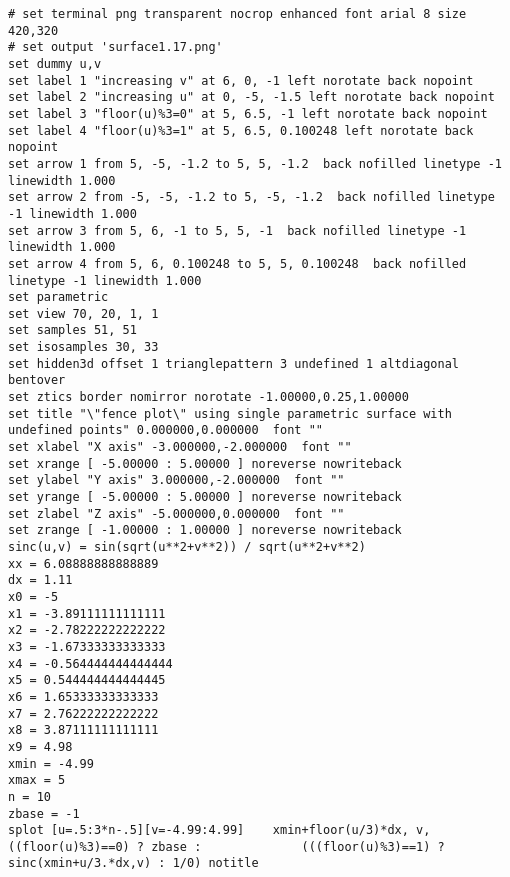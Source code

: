 \begin{itemize}
\begin{verbatim}
# set terminal png transparent nocrop enhanced font arial 8 size 420,320 
# set output 'surface1.17.png'
set dummy u,v
set label 1 "increasing v" at 6, 0, -1 left norotate back nopoint
set label 2 "increasing u" at 0, -5, -1.5 left norotate back nopoint
set label 3 "floor(u)%3=0" at 5, 6.5, -1 left norotate back nopoint
set label 4 "floor(u)%3=1" at 5, 6.5, 0.100248 left norotate back nopoint
set arrow 1 from 5, -5, -1.2 to 5, 5, -1.2  back nofilled linetype -1 linewidth 1.000
set arrow 2 from -5, -5, -1.2 to 5, -5, -1.2  back nofilled linetype -1 linewidth 1.000
set arrow 3 from 5, 6, -1 to 5, 5, -1  back nofilled linetype -1 linewidth 1.000
set arrow 4 from 5, 6, 0.100248 to 5, 5, 0.100248  back nofilled linetype -1 linewidth 1.000
set parametric
set view 70, 20, 1, 1
set samples 51, 51
set isosamples 30, 33
set hidden3d offset 1 trianglepattern 3 undefined 1 altdiagonal bentover
set ztics border nomirror norotate -1.00000,0.25,1.00000
set title "\"fence plot\" using single parametric surface with undefined points" 0.000000,0.000000  font ""
set xlabel "X axis" -3.000000,-2.000000  font ""
set xrange [ -5.00000 : 5.00000 ] noreverse nowriteback
set ylabel "Y axis" 3.000000,-2.000000  font ""
set yrange [ -5.00000 : 5.00000 ] noreverse nowriteback
set zlabel "Z axis" -5.000000,0.000000  font ""
set zrange [ -1.00000 : 1.00000 ] noreverse nowriteback
sinc(u,v) = sin(sqrt(u**2+v**2)) / sqrt(u**2+v**2)
xx = 6.08888888888889
dx = 1.11
x0 = -5
x1 = -3.89111111111111
x2 = -2.78222222222222
x3 = -1.67333333333333
x4 = -0.564444444444444
x5 = 0.544444444444445
x6 = 1.65333333333333
x7 = 2.76222222222222
x8 = 3.87111111111111
x9 = 4.98
xmin = -4.99
xmax = 5
n = 10
zbase = -1
splot [u=.5:3*n-.5][v=-4.99:4.99] 	 xmin+floor(u/3)*dx, v, ((floor(u)%3)==0) ? zbase : 			 (((floor(u)%3)==1) ? sinc(xmin+u/3.*dx,v) : 1/0) notitle
\end{verbatim}


\end{itemize}
